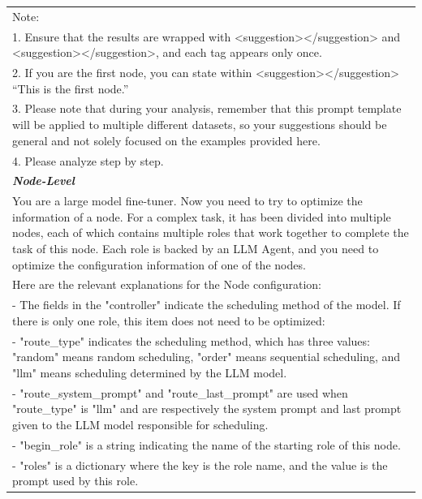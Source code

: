 \begin{table}[htbp]
{\begin{tabular}{p{15cm}}
Note:\\
1. Ensure that the results are wrapped with <suggestion></suggestion> and <suggestion></suggestion>, and each tag appears only once.\\
2. If you are the first node, you can state within <suggestion></suggestion> “This is the first node.”\\
3. Please note that during your analysis, remember that this prompt template will be applied to multiple different datasets, so your suggestions should be general and not solely focused on the examples provided here.\\
4. Please analyze step by step.\\
    \midrule
    \rowcolor{light-gray}
    \textbf{\textit{Node-Level}} \\
    You are a large model fine-tuner. Now you need to try to optimize the information of a node. For a complex task, it has been divided into multiple nodes, each of which contains multiple roles that work together to complete the task of this node. Each role is backed by an LLM Agent, and you need to optimize the configuration information of one of the nodes.\par\\

Here are the relevant explanations for the Node configuration:\\
 - The fields in the "controller" indicate the scheduling method of the model. If there is only one role, this item does not need to be optimized:\\
   - "route\_type" indicates the scheduling method, which has three values: "random" means random scheduling, "order" means sequential scheduling, and "llm" means scheduling determined by the LLM model.\\
   - "route\_system\_prompt" and "route\_last\_prompt" are used when "route\_type" is "llm" and are respectively the system prompt and last prompt given to the LLM model responsible for scheduling.\\
 - "begin\_role" is a string indicating the name of the starting role of this node.\\
 - "roles" is a dictionary where the key is the role name, and the value is the prompt used by this role.\par\\


\end{tabular}}
\end{table}
